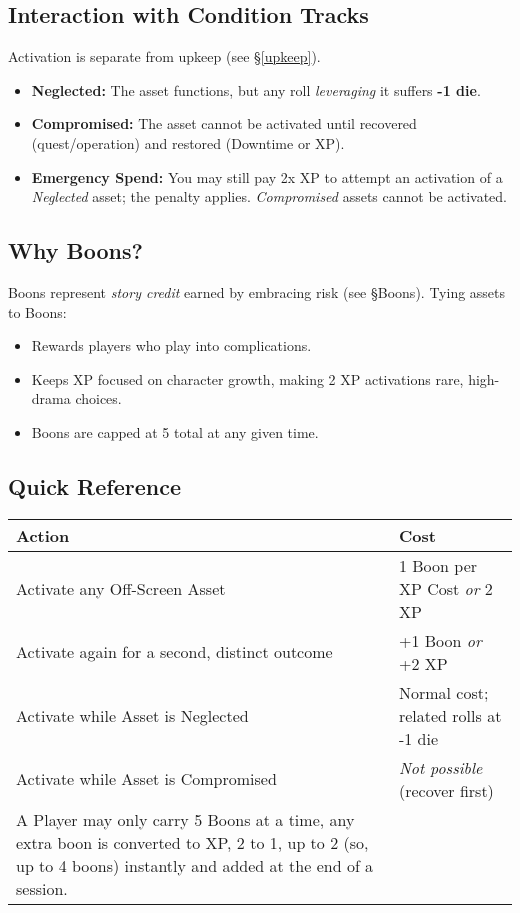 \documentclass[12pt]{article}
\begin{document}
\subsection*{Interaction with Condition Tracks}
Activation is separate from upkeep (see \S\ref{upkeep}).
\begin{itemize}
  \item \textbf{Neglected:} The asset functions, but any roll \emph{leveraging} it suffers \textbf{-1 die}.
  \item \textbf{Compromised:} The asset cannot be activated until recovered (quest/operation) and restored (Downtime or XP).
  \item \textbf{Emergency Spend:} You may still pay 2x XP to attempt an activation of a \emph{Neglected} asset; the penalty applies. \emph{Compromised} assets cannot be activated.
\end{itemize}

\subsection*{Why Boons?}
Boons represent \emph{story credit} earned by embracing risk (see \S Boons). Tying assets to Boons:
\begin{itemize}
  \item Rewards players who play into complications.
  \item Keeps XP focused on character growth, making 2 XP activations rare, high-drama choices.
  \item Boons are capped at 5 total at any given time.
\end{itemize}

\subsection*{Quick Reference}
\begin{center}
\begin{tabular}{ll}
\toprule
\textbf{Action} & \textbf{Cost} \\
\midrule
Activate any Off-Screen Asset & 1 Boon per XP Cost \emph{or} 2 XP \\
Activate again for a second, distinct outcome & +1 Boon \emph{or} +2 XP \\
Activate while Asset is Neglected & Normal cost; related rolls at -1 die \\
Activate while Asset is Compromised & \textit{Not possible} (recover first) \\
A Player may only carry 5 Boons at a time, any extra boon is converted to XP, 2 to 1, up to 2 (so, up to 4 boons) instantly and added at the end of a session.
\bottomrule
\end{tabular}
\end{center}
\end{document}
